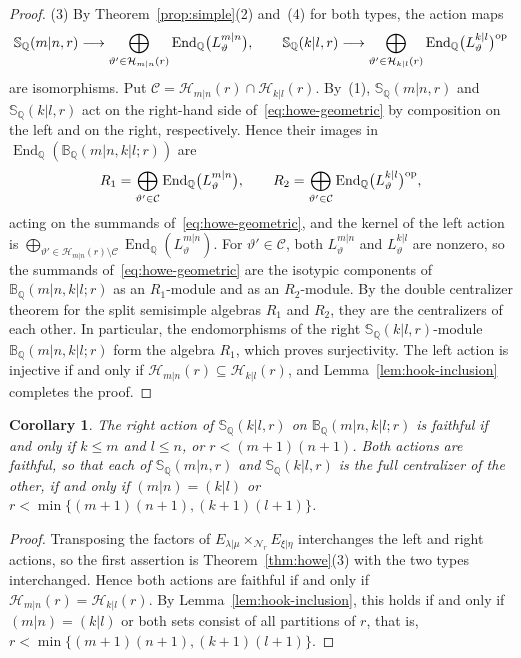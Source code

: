 \documentclass[11pt,a4paper]{amsart}
\newtheorem{corollary}[theorem]{Corollary}
\theoremstyle{definition}
\theoremstyle{remark}
\newcommand{\Q}{\mathbb Q}
\newcommand{\N}{\mathcal N}
\newcommand{\bS}{\mathbb S}
\newcommand{\bB}{\mathbb B}
\newcommand{\End}{\operatorname{End}}
\newcommand{\lm}{\lambda|\mu}
\newcommand{\xh}{\xi|\eta}
\numberwithin{equation}{section}
\begin{document}
\begin{proof}
(3) By Theorem~\ref{prop:simple}(2) and~(4) for both types, the action maps
$$
\bS_\Q(m|n,r)\longrightarrow\bigoplus_{\vartheta'\in\mathcal H_{m|n}(r)}
\End_\Q\bigl(L^{m|n}_\vartheta\bigr),\qquad
\bS_\Q(k|l,r)\longrightarrow\bigoplus_{\vartheta'\in\mathcal H_{k|l}(r)}
\End_\Q\bigl(L^{k|l}_\vartheta\bigr)^{\rm op}
$$
are isomorphisms. Put
$\mathcal C=\mathcal H_{m|n}(r)\cap\mathcal H_{k|l}(r)$. By~(1), $\bS_\Q(m|n,r)$
and $\bS_\Q(k|l,r)$ act on the right-hand side of~\eqref{eq:howe-geometric} by
composition on the left and on the right, respectively. Hence their
images in $\End_\Q(\bB_\Q(m|n,k|l;r))$ are
$$
R_1=\bigoplus_{\vartheta'\in\mathcal C}\End_\Q\bigl(L^{m|n}_\vartheta\bigr),
\qquad
R_2=\bigoplus_{\vartheta'\in\mathcal C}\End_\Q\bigl(L^{k|l}_\vartheta\bigr)^{\rm op},
$$
acting on the summands of~\eqref{eq:howe-geometric}, and the kernel of the
left action is
$\bigoplus_{\vartheta'\in\mathcal H_{m|n}(r)\setminus\mathcal C}
\End_\Q(L^{m|n}_\vartheta)$. For $\vartheta'\in\mathcal C$, both
$L^{m|n}_\vartheta$ and $L^{k|l}_\vartheta$ are nonzero, so the summands
of~\eqref{eq:howe-geometric} are the isotypic components of $\bB_\Q(m|n,k|l;r)$ as
an $R_1$-module and as an $R_2$-module. By the double centralizer theorem
for the split semisimple algebras $R_1$ and $R_2$, they are the
centralizers of each other. In particular, the endomorphisms of the right
$\bS_\Q(k|l,r)$-module $\bB_\Q(m|n,k|l;r)$ form the algebra $R_1$, which proves
surjectivity. The left action is injective if and only if
$\mathcal H_{m|n}(r)\subseteq\mathcal H_{k|l}(r)$, and
Lemma~\ref{lem:hook-inclusion} completes the proof.
\end{proof}

\begin{corollary}\label{cor:howe-faithful}
The right action of $\bS_\Q(k|l,r)$ on $\bB_\Q(m|n,k|l;r)$ is faithful if
and only if $k\leq m$ and $l\leq n$, or $r<(m+1)(n+1)$. Both actions are
faithful, so that each of $\bS_\Q(m|n,r)$ and $\bS_\Q(k|l,r)$ is the full
centralizer of the other, if and only if $(m|n)=(k|l)$ or
$r<\min\{(m+1)(n+1),(k+1)(l+1)\}$.
\end{corollary}
\begin{proof}
Transposing the factors of $E_{\lm}\times_{\N_r}E_{\xh}$ interchanges the
left and right actions, so the first assertion is
Theorem~\ref{thm:howe}(3) with the two types interchanged. Hence both
actions are faithful if and only if
$\mathcal H_{m|n}(r)=\mathcal H_{k|l}(r)$. By
Lemma~\ref{lem:hook-inclusion}, this holds if and only if $(m|n)=(k|l)$
or both sets consist of all partitions of $r$, that is,
$r<\min\{(m+1)(n+1),(k+1)(l+1)\}$.
\end{proof}
\end{document}
